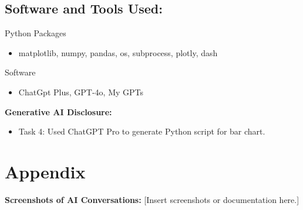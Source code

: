 \documentclass[a4paper,landscape]{article}
\begin{document}
\subsection{Software and Tools Used:}
Python Packages
\begin{itemize}
    \item matplotlib, numpy, pandas, os, subprocess, plotly, dash
\end{itemize}
Software
\begin{itemize}
    \item ChatGpt Plus, GPT-4o, My GPTs
\end{itemize}
\textbf{Generative AI Disclosure:}
\begin{itemize}
    \item Task 4: Used ChatGPT Pro to generate Python script for bar chart.
\end{itemize}

\section{Appendix}
\textbf{Screenshots of AI Conversations:}
[Insert screenshots or documentation here.]
\end{document}
